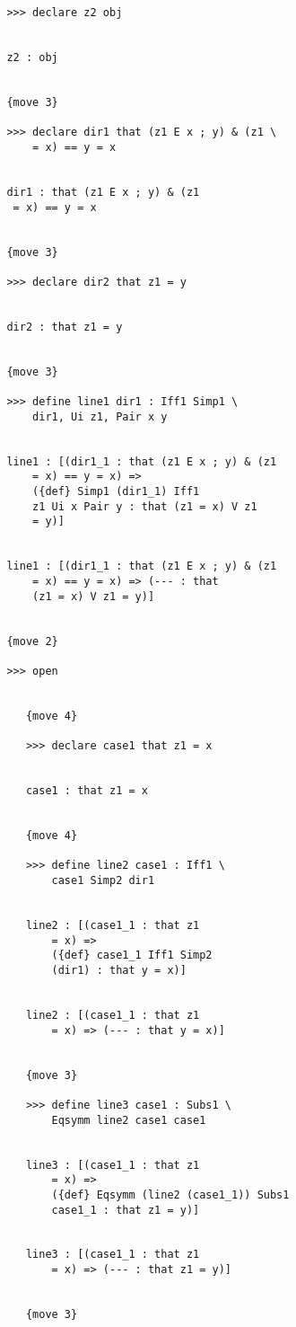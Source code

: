 \documentclass[12pt]{article}
\begin{document}
\begin{verbatim}
         >>> declare z2 obj


         z2 : obj


         {move 3}

         >>> declare dir1 that (z1 E x ; y) & (z1 \
             = x) == y = x


         dir1 : that (z1 E x ; y) & (z1 
          = x) == y = x


         {move 3}

         >>> declare dir2 that z1 = y


         dir2 : that z1 = y


         {move 3}

         >>> define line1 dir1 : Iff1 Simp1 \
             dir1, Ui z1, Pair x y


         line1 : [(dir1_1 : that (z1 E x ; y) & (z1 
             = x) == y = x) => 
             ({def} Simp1 (dir1_1) Iff1 
             z1 Ui x Pair y : that (z1 = x) V z1 
             = y)]


         line1 : [(dir1_1 : that (z1 E x ; y) & (z1 
             = x) == y = x) => (--- : that 
             (z1 = x) V z1 = y)]


         {move 2}

         >>> open


            {move 4}

            >>> declare case1 that z1 = x


            case1 : that z1 = x


            {move 4}

            >>> define line2 case1 : Iff1 \
                case1 Simp2 dir1


            line2 : [(case1_1 : that z1 
                = x) => 
                ({def} case1_1 Iff1 Simp2 
                (dir1) : that y = x)]


            line2 : [(case1_1 : that z1 
                = x) => (--- : that y = x)]


            {move 3}

            >>> define line3 case1 : Subs1 \
                Eqsymm line2 case1 case1


            line3 : [(case1_1 : that z1 
                = x) => 
                ({def} Eqsymm (line2 (case1_1)) Subs1 
                case1_1 : that z1 = y)]


            line3 : [(case1_1 : that z1 
                = x) => (--- : that z1 = y)]


            {move 3}


\end{verbatim}
\end{document}
